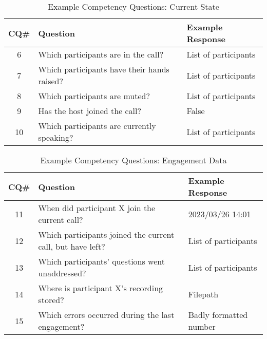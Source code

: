 \begin{table}
  \caption{Example Competency Questions: Current State}
  \label{tab:CQ_state}
  \begin{tabular}{cll}
    \toprule
    CQ\#&Question&Example Response\\
    \midrule
    6&Which participants are in the call?&List of participants\\
    7&Which participants have their hands raised?&List of participants\\
    8&Which participants are muted?&List of participants\\
    9&Has the host joined the call?&False\\
    10&Which participants are currently speaking?&List of participants\\
  \bottomrule
\end{tabular}
\end{table}

\begin{table}
  \caption{Example Competency Questions: Engagement Data}
  \label{tab:CQ_data}
  \begin{tabular}{cll}
    \toprule
    CQ\#&Question&Example Response\\
    \midrule
    11&When did participant X join the current call?&2023/03/26 14:01\\
    12&Which participants joined the current call, but have left?&List of participants\\
    13&Which participants' questions went unaddressed?&List of participants\\
    14&Where is participant X’s recording stored?&Filepath\\
    15&Which errors occurred during the last engagement?&Badly formatted number\\
  \bottomrule
\end{tabular}
\end{table}

